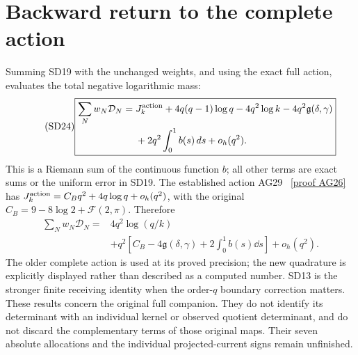 \documentclass[11pt]{article}
\begin{document}
\section{Backward return to the complete action}
Summing SD19 with the unchanged weights, and using the exact full
action, evaluates the total negative logarithmic mass:
\begin{equation}\tag{SD24}
\boxed{\begin{aligned}
\sum_Nw_N\mathcal D_N={}&J_k^{\rm action}
+4q(q-1)\log q-4q^2\log k-4q^2\mathfrak g(\delta,\gamma)\\
&+2q^2\int_0^1 b(s)\,d s+o_h(q^2).
\end{aligned}}
\end{equation}
This is a Riemann sum of the continuous function $b$; all other terms
are exact sums or the uniform error in SD19. The established action
AG29 \cite{AG}%
~\href{https://github.com/KokunoYumeto/zeta-function-research-reader/blob/5992ad50c0f2a06921f1fcaded7b4e38097c0739/workbenches/splitzero-tandem/continuations/20260920-original-kernel-mixed-determinants/providers/ABSOLUTE_GAMMA_AND_ACTION.tex\#L358}{[proof AG26]}%
{} has $J_k^{\rm action}=C_Bq^2+4q\log q+o_h(q^2)$,
with the original $C_B=9-8\log2+\mathcal F(2,\pi)$. Therefore
\begin{equation}\tag{SD25}
\boxed{\begin{aligned}
\sum_Nw_N\mathcal D_N={}&4q^2\log(q/k)\\
&+q^2\left[C_B-4\mathfrak g(\delta,\gamma)
+2\int_0^1b(s)\dd s\right]+o_h(q^2).
\end{aligned}}
\end{equation}
The older complete action is used at its proved precision; the new
quadrature is explicitly displayed rather than described as a computed
number. SD13 is the stronger finite receiving identity when the
order-$q$ boundary correction matters. These results concern the
original full companion. They do not identify its determinant with an
individual kernel or observed quotient determinant, and do not discard
the complementary terms of those original maps. Their seven absolute
allocations and the individual projected-current signs remain unfinished.
\end{document}
